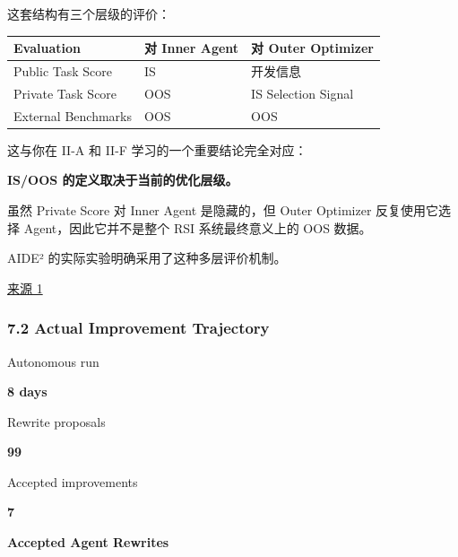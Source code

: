
这套结构有三个层级的评价：

\begin{readertable}
\begin{longtable}[]{@{}
  >{\raggedright\arraybackslash}p{}
  >{\raggedright\arraybackslash}p{}
  >{\raggedright\arraybackslash}p{}@{}}
\toprule
Evaluation & 对 Inner Agent & 对 Outer Optimizer \\
\midrule
\endhead
Public Task Score & IS & 开发信息 \\
Private Task Score & OOS & IS Selection Signal \\
External Benchmarks & OOS & OOS \\
\bottomrule
\end{longtable}
\end{readertable}

这与你在 II-A 和 II-F 学习的一个重要结论完全对应：

\textbf{IS/OOS 的定义取决于当前的优化层级。}

虽然 Private Score 对 Inner Agent 是隐藏的，但 Outer Optimizer 反复使用它选择 Agent，因此它并不是整个 RSI 系统最终意义上的 OOS 数据。

AIDE² 的实际实验明确采用了这种多层评价机制。

\href{https://arxiv.org/html/2609.26457v1}{来源 1}

\hypertarget{part-3-44-0001-actual-improvement-trajectory}{%
\subsubsection{7.2 Actual Improvement Trajectory}\label{part-3-44-0001-actual-improvement-trajectory}}

Autonomous run

\textbf{8 days}

Rewrite proposals

\textbf{99}

Accepted improvements

\textbf{7}

\textbf{Accepted Agent Rewrites}


